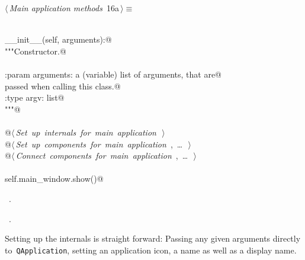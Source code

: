 \documentclass[
    a4paper,      %
    10pt,         %
    openright,    %
    notitlepage,  %
    parskip=half, %
]{scrreprt}       %
\theoremstyle{definition}                    %
\begin{document}
\begin{flushleft} \small
\begin{minipage}{\linewidth}\label{scrap3}\raggedright\small
{} $\langle\,${\itshape Main application methods}\nobreak\ {\footnotesize {16a}}$\,\rangle\equiv$
\vspace{-1ex}
\begin{list}{}{} \item
\mbox{}\lstinline@@\\
\mbox{}\lstinline@def __init__(self, arguments):@\\
\mbox{}\lstinline@    """Constructor.@\\
\mbox{}\lstinline@@\\
\mbox{}\lstinline@    :param arguments: a (variable) list of arguments, that are@\\
\mbox{}\lstinline@                      passed when calling this class.@\\
\mbox{}\lstinline@    :type  argv:      list@\\
\mbox{}\lstinline@    """@\\
\mbox{}\lstinline@@\\
\mbox{}\lstinline@    @\hbox{$\langle\,${\itshape Set up internals for main application}\nobreak\ {\footnotesize {}}$\,\rangle$}\lstinline@@\\
\mbox{}\lstinline@    @\hbox{$\langle\,${\itshape Set up components for main application}\nobreak\ {\footnotesize {}, \ldots\ }$\,\rangle$}\lstinline@@\\
\mbox{}\lstinline@    @\hbox{$\langle\,${\itshape Connect components for main application}\nobreak\ {\footnotesize {}, \ldots\ }$\,\rangle$}\lstinline@@\\
\mbox{}\lstinline@@\\
\mbox{}\lstinline@    self.main_window.show()@\\
\mbox{}\lstinline@@{\NWsep}
\end{list}
\vspace{-1.5ex}
\footnotesize
\begin{list}{}{\setlength{\itemsep}{-\parsep}\setlength{\itemindent}{-\leftmargin}}
\item \NWtxtMacroDefBy\ .
\item \NWtxtMacroRefIn\ .

\item{}
\end{list}
\end{minipage}\vspace{4ex}
\end{flushleft}
Setting up the internals is straight forward: Passing any given arguments
directly to~\verb+QApplication+, setting an application icon, a name as well as
a display name.
\end{document}
